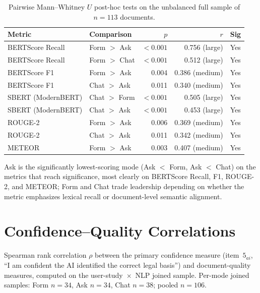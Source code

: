 \begin{table}[htbp]
\centering
\caption{Pairwise Mann--Whitney $U$ post-hoc tests on the
unbalanced full sample of $n = 113$ documents.}
\label{tab:app-nlp-mwu}
\small
\begin{tabular}{@{}l l r r l@{}}
\toprule
Metric & Comparison & $p$ & $r$ & Sig \\
\midrule
BERTScore Recall & Form $>$ Ask  & $<0.001$ & 0.756 (large)  & Yes \\
BERTScore Recall & Form $>$ Chat & $<0.001$ & 0.512 (large)  & Yes \\
BERTScore F1     & Form $>$ Ask  & 0.004    & 0.386 (medium) & Yes \\
BERTScore F1     & Chat $>$ Ask  & 0.011    & 0.340 (medium) & Yes \\
SBERT (ModernBERT) & Chat $>$ Form & $<0.001$ & 0.505 (large)  & Yes \\
SBERT (ModernBERT) & Chat $>$ Ask  & $<0.001$ & 0.453 (large)  & Yes \\
ROUGE-2          & Form $>$ Ask  & 0.006    & 0.369 (medium) & Yes \\
ROUGE-2          & Chat $>$ Ask  & 0.011    & 0.342 (medium) & Yes \\
METEOR           & Form $>$ Ask  & 0.003    & 0.407 (medium) & Yes \\
\bottomrule
\end{tabular}
\end{table}

Ask is the significantly lowest-scoring mode (Ask $<$ Form, Ask
$<$ Chat) on the metrics that reach significance, most clearly on
BERTScore Recall, F1, ROUGE-2, and METEOR; Form and Chat trade
leadership depending on whether the metric emphasizes lexical
recall or document-level semantic alignment.

\section{Confidence--Quality Correlations}
\label{app:inf-corr}

Spearman rank correlation $\rho$ between the primary confidence measure
(item~$5_{ai}$, ``I am confident the AI identified the correct legal basis'')
and document-quality measures, computed on the user-study~$\times$~NLP joined
sample. Per-mode joined samples: Form $n = 34$, Ask $n = 34$, Chat $n = 38$;
pooled $n = 106$.

